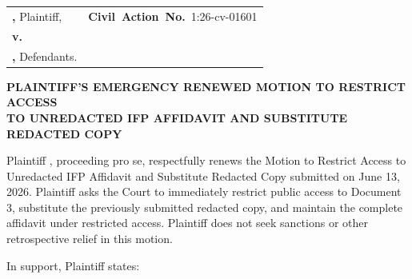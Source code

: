 \documentclass[12pt]{article}
\makeatletter
\renewcommand{\FilingCivilActionNumber}{1:26-cv-01601}
\newcommand{\Caption}{%
  \begin{center}
  \textbf{\FilingCourtName}\\
  \textbf{\FilingDistrictName}\\
  \textbf{\FilingDivisionName}
  \end{center}

  \vspace{0.5em}

  \noindent
  \begin{tabularx}{\textwidth}{@{}>{\raggedright\arraybackslash}X>{\raggedright\arraybackslash}p{2.45in}@{}}
  \textbf{\FilingPlaintiffNameUpper,} Plaintiff, & \mbox{\textbf{Civil Action No.} \FilingCivilActionNumber} \\
  \textbf{v.} & \\
  \textbf{\FilingDefendantsInlineUpper,} Defendants. & \\
  \end{tabularx}

  \vspace{1.25em}
}
\makeatother
\begin{document}
\Caption

\begin{center}
\textbf{PLAINTIFF'S EMERGENCY RENEWED MOTION TO RESTRICT ACCESS}\\
\textbf{TO UNREDACTED IFP AFFIDAVIT AND SUBSTITUTE REDACTED COPY}
\end{center}

Plaintiff \FilingPlaintiffName, proceeding pro se, respectfully renews the Motion to Restrict Access to Unredacted IFP Affidavit and Substitute Redacted Copy submitted on June 13, 2026. Plaintiff asks the Court to immediately restrict public access to Document 3, substitute the previously submitted redacted copy, and maintain the complete affidavit under restricted access. Plaintiff does not seek sanctions or other retrospective relief in this motion.

In support, Plaintiff states:
\end{document}
